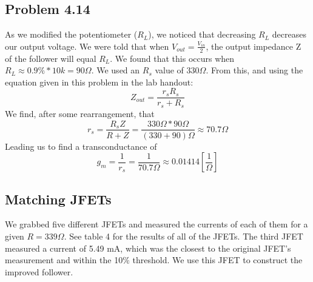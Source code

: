 \documentclass{article}
\begin{document}
\subsection{Problem 4.14}
    As we modified the potentiometer ($R_L$), we noticed that decreasing $R_L$ decreases our output voltage. We were told that when $V_{out} = \frac{V_{in}}{2}$, the output impedance Z of the follower will equal $R_L$. We found that this occurs when $R_L \approx 0.9 \% * 10k = 90 \Omega$. We used an $R_s$ value of 330$\Omega$. From this, and using the equation given in this problem in the lab handout:
    \begin{equation}
        Z_{out} = \frac{r_s R_s}{r_s + R_s}
    \end{equation}
    We find, after some rearrangement, that 
    \begin{equation}
        r_s = \frac{R_s Z}{R + Z} = \frac{330 \Omega * 90 \Omega}{(330 + 90)\Omega} \approx 70.7 \Omega
    \end{equation}
    Leading us to find a transconductance of
    \begin{equation}
        g_m = \frac{1}{r_s} = \frac{1}{70.7 \Omega} \approx 0.01414 [\frac{1}{\Omega}]
    \end{equation}

\subsection{Matching JFETs}
    We grabbed five different JFETs and measured the currents of each of them for a given $R = 339\Omega$. See table 4 for the results of all of the JFETs. The third JFET measured a current of 5.49 mA, which was the closest to the original JFET's measurement and within the 10$\%$ threshold. We use this JFET to construct the improved follower.
    
\end{document}
